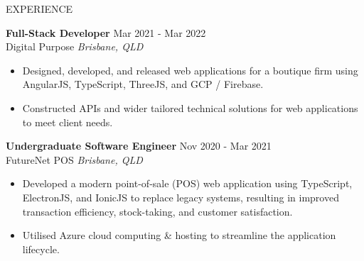 \documentclass{resume} %
\begin{document}
\begin{rSection}{EXPERIENCE}
\newpage

\textbf{Full-Stack Developer} \hfill Mar 2021 - Mar 2022\\
Digital Purpose \hfill \textit{Brisbane, QLD}
 \begin{itemize}
    \itemsep -3pt {}
    \item Designed, developed, and released web applications for a boutique firm using AngularJS, TypeScript, ThreeJS, and GCP / Firebase.
    \item Constructed APIs and wider tailored technical solutions for web applications to meet client needs.
 \end{itemize}

\textbf{Undergraduate Software Engineer} \hfill Nov 2020 - Mar 2021\\
FutureNet POS \hfill \textit{Brisbane, QLD}
 \begin{itemize}
    \itemsep -3pt {}
    \item Developed a modern point-of-sale (POS) web application using TypeScript, ElectronJS, and IonicJS to replace legacy systems, resulting in improved transaction efficiency, stock-taking, and customer satisfaction.
    \item Utilised Azure cloud computing \& hosting to streamline the application lifecycle.
 \end{itemize}

\end{rSection}
\end{document}
